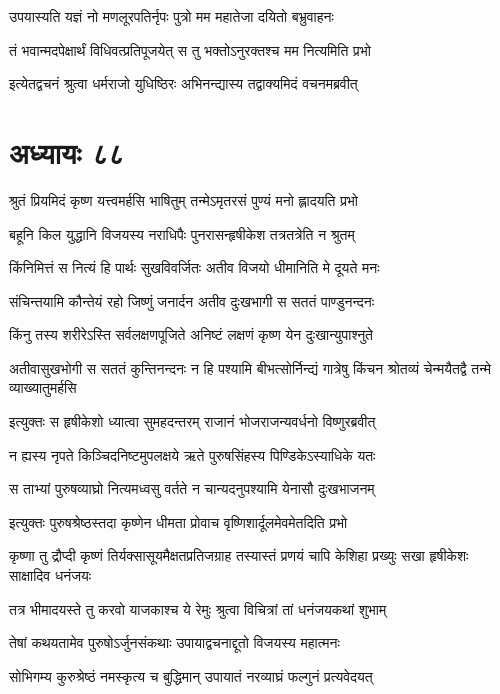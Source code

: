 \twolineshloka
{उपयास्यति यज्ञं नो मणलूरपतिर्नृपः}
{पुत्रो मम महातेजा दयितो बभ्रुवाहनः}


\twolineshloka
{तं भवान्मदपेक्षार्थं विधिवत्प्रतिपूजयेत्}
{स तु भक्तोऽनुरक्तश्च मम नित्यमिति प्रभो}


\twolineshloka
{इत्येतद्वचनं श्रुत्वा धर्मराजो युधिष्ठिरः}
{अभिनन्द्यास्य तद्वाक्यमिदं वचनमब्रवीत्}


\chapter{अध्यायः ८८}
\twolineshloka
{श्रुतं प्रियमिदं कृष्ण यत्त्वमर्हसि भाषितुम्}
{तन्मेऽमृतरसं पुण्यं मनो ह्लादयति प्रभो}


\twolineshloka
{बहूनि किल युद्धानि विजयस्य नराधिपैः}
{पुनरासन्हृषीकेश तत्रतत्रेति न श्रुतम्}


\twolineshloka
{किंनिमित्तं स नित्यं हि पार्थः सुखविवर्जितः}
{अतीव विजयो धीमानिति मे दूयते मनः}


\twolineshloka
{संचिन्तयामि कौन्तेयं रहो जिष्णुं जनार्दन}
{अतीव दुःखभागी स सततं पाण्डुनन्दनः}


\twolineshloka
{किंनु तस्य शरीरेऽस्ति सर्वलक्षणपूजिते}
{अनिष्टं लक्षणं कृष्ण येन दुःखान्युपाश्नुते}


\threelineshloka
{अतीवासुखभोगी स सततं कुन्तिनन्दनः}
{न हि पश्यामि बीभत्सोर्निन्द्यं गात्रेषु किंचन}
{श्रोतव्यं चेन्मयैतद्वै तन्मे व्याख्यातुमर्हसि}


\twolineshloka
{इत्युक्तः स हृषीकेशो ध्यात्वा सुमहदन्तरम्}
{राजानं भोजराजन्यवर्धनो विष्णुरब्रवीत्}


\twolineshloka
{न ह्यस्य नृपते किञ्चिदनिष्टमुपलक्षये}
{ऋते पुरुषसिंहस्य पिण्डिकेऽस्याधिके यतः}


\twolineshloka
{स ताभ्यां पुरुषव्याघ्रो नित्यमध्वसु वर्तते}
{न चान्यदनुपश्यामि येनासौ दुःखभाजनम्}


\twolineshloka
{इत्युक्तः पुरुषश्रेष्ठस्तदा कृष्णेन धीमता}
{प्रोवाच वृष्णिशार्दूलमेवमेतदिति प्रभो}


\twolineshloka
{कृष्णा तु द्रौप्दी कृष्णं तिर्यक्सासूयमैक्षतप्रतिजग्राह तस्यास्तं प्रणयं चापि केशिहा}
{प्रख्युः सखा हृषीकेशः साक्षादिव धनंजयः}


\twolineshloka
{तत्र भीमादयस्ते तु करवो याजकाश्च ये}
{रेमुः श्रुत्वा विचित्रां तां धनंजयकथां शुभाम्}


\twolineshloka
{तेषां कथयतामेव पुरुषोऽर्जुनसंकथाः}
{उपायाद्वचनाद्दूतो विजयस्य महात्मनः}


\twolineshloka
{सोभिगम्य कुरुश्रेष्ठं नमस्कृत्य च बुद्धिमान्}
{उपायातं नरव्याघ्रं फल्गुनं प्रत्यवेदयत्}


